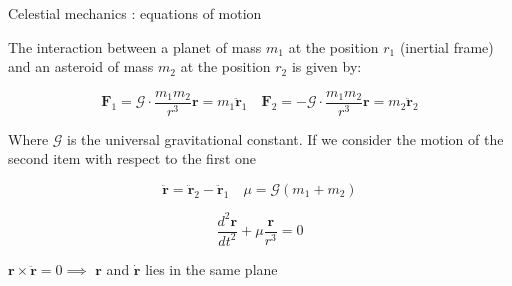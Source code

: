 \documentclass{beamer}
\begin{document}
\begin{frame}{Celestial mechanics \cite{murray1999solar}: equations of motion}

\begin{center}
The interaction between a planet of mass $m_{1}$ at the  position $r_{1}$ (inertial frame) and an asteroid of mass $m_{2}$  at the position $r_{2}$ is given by: 
\end{center}


\begin{equation}
\textbf{F}_{1}=\mathcal{G} \cdot \frac{m_{1}m_{2}}{r^{3}}\textbf{r}=m_{1} \ddot{\textbf{r}}_{1}\quad \textbf{F}_{2}=-\mathcal{G} \cdot \frac{m_{1}m_{2}}{r^{3}}\textbf{r}=m_{2} \ddot{\textbf{r}}_{2}
\end{equation}

 
\begin{center}
Where $\mathcal{G}$ is the universal gravitational constant. If we consider the motion of the second item with respect to the first one 
\end{center}
 
\begin{equation}
\ddot{\textbf{r}}=\ddot{\textbf{r}}_{2}-\ddot{\textbf{r}}_{1} \quad \mu=\mathcal{G}(m_{1}+m_{2})
\end{equation}

\begin{equation}
\dfrac{d^{2}\textbf{r}}{dt^{2}}+\mu\dfrac{\textbf{r}}{r^{3}}=0
\end{equation}

\begin{center}
$\textbf{r} \times \ddot{ \textbf{r}}=0  \implies $ $\textbf{r}$  and $\dot{\textbf{r}}$ lies in the same plane

\end{center}
\end{frame}
\end{document}

